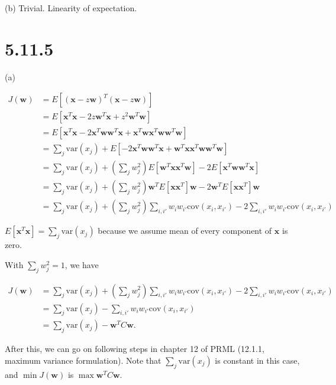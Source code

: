 \documentclass[12pt]{article}
\newcommand{\vect}[1]{\boldsymbol{#1}}
\begin{document}
(b) Trivial. Linearity of expectation.


\section*{5.11.5} %
\label{sec:5_11_5}
(a) 

\begin{align}
J(\vect{w})  & = E[    ( \vect{x}- z\vect{w} )^T  ( \vect{x}- z\vect{w} )] \\
 & = E[ \vect{x}^T \vect{x} - 2z \vect{w}^T \vect{x} + z^2 \vect{w}^T \vect{w}  ] \\
 & = E[ \vect{x}^T \vect{x} - 2 \vect{x}^T \vect{w}  \vect{w}^T \vect{x} + \vect{x}^T \vect{w} \vect{x}^T \vect{w} \vect{w}^T \vect{w}  ] \\
 &  = \sum_j \mathrm{var}(x_j) + E[  - 2 \vect{x}^T \vect{w}  \vect{w}^T \vect{x} + \vect{w}^T \vect{x} \vect{x}^T \vect{w} \vect{w}^T \vect{w}  ]\\
 & = \sum_j \mathrm{var}(x_j)  + (\sum_j w_j^2 )  E[  \vect{w}^T \vect{x} \vect{x}^T \vect{w}] -  2  E[ \vect{x}^T \vect{w}  \vect{w}^T \vect{x}] \\
 & = \sum_j \mathrm{var}(x_j)  + (\sum_j w_j^2 )    \vect{w}^T E[\vect{x} \vect{x}^T] \vect{w} -  2  \vect{w}^T E[ \vect{x}  \vect{x}^T ]\vect{w} \\
 & = \sum_j \mathrm{var}(x_j) + (\sum_j w_j^2 ) \sum_{i,i'} w_i w_{i'} \mathrm{cov}(x_i,x_{i'}) - 2 \sum_{i,i'} w_i w_{i'} \mathrm{cov}(x_i,x_{i'})
\end{align}

$E[ \vect{x}^T \vect{x}] = \sum_j \mathrm{var}(x_j) $ because we assume mean of every component of $\vect{x}$ is zero.

With $\sum_j w_j^2 = 1$, we have

\begin{align}
J( \vect{w}  ) & = \sum_j \mathrm{var}(x_j) + (\sum_j w_j^2 ) \sum_{i,i'} w_i w_{i'} \mathrm{cov}(x_i,x_{i'}) - 2 \sum_{i,i'} w_i w_{i'} \mathrm{cov}(x_i,x_{i'})  \\
   & = \sum_j \mathrm{var}(x_j) - \sum_{i,i'} w_i w_{i'} \mathrm{cov}(x_i,x_{i'}) \\
   & = \sum_j \mathrm{var}(x_j) - \vect{w}^T C \vect{w}.
\end{align}

After this, we can go on following steps in chapter 12 of PRML (12.1.1, maximum variance formulation). Note that $\sum_j \mathrm{var}(x_j)$ is constant in this case, and $\min J( \vect{w}  )$ is $\max \vect{w}^T C \vect{w}$.






\end{document}
